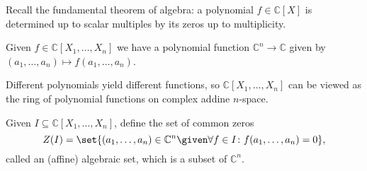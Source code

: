 Recall the fundamental theorem of algebra: a polynomial $f \in \mathbb{C}[X]$ is
determined up to scalar multiples by its zeros up to multiplicity.

Given $f \in \mathbb{C}[X_1, \ldots, X_n]$ we have a polynomial function
$\mathbb{C}^n \to \mathbb{C}$ given by $(a_1, \ldots, a_n)\mapsto f(a_1, \ldots, a_n)$.

Different polynomials yield different functions, so $\mathbb{C}[X_1, \ldots, X_n]$
can be viewed as the ring of polynomial functions on complex addine $n$-space.

Given $I \subseteq \mathbb{C}[X_1, \ldots, X_n]$, define the set of common zeros
\[ Z(I) = \set{(a_1, \ldots, a_n) \in \mathbb{C}^n\given \forall f \in I\colon f(a_1, \ldots, a_n) = 0 }, \]
called an (affine) algebraic set, which is a subset of $\mathbb{C}^n$.
